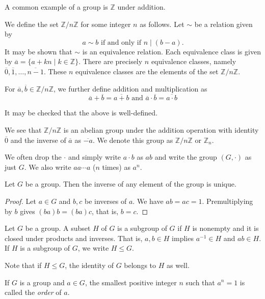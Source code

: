 A common example of a group is $\mathbb{Z}$ under addition.

\vspace{2mm}
We define the set $\mathbb{Z}/n\mathbb{Z}$ for some integer $n$ as follows. Let $\sim$ be a relation given by
$$a\sim b\text{ if and only if }n\mid (b-a).$$
It may be shown that $\sim$ is an equivalence relation. Each equivalence class is given by $\overline{a}=\{a+kn\mid k\in\mathbb{Z}\}$. There are precisely $n$ equivalence classes, namely $\overline{0}, \overline{1}, \ldots, \overline{n-1}$. These $n$ equivalence classes are the elements of the set $\mathbb{Z}/n\mathbb{Z}$.

For $\overline{a}, \overline{b}\in \mathbb{Z}/n\mathbb{Z}$, we further define addition and multiplication as
$$\overline{a}+\overline{b}=\overline{a+b}\text{ and }\overline{a}\cdot\overline{b}=\overline{a\cdot b}$$

It may be checked that the above is well-defined.

We see that $\mathbb{Z}/n\mathbb{Z}$ is an abelian group under the addition operation with identity $\overline{0}$ and the inverse of $\overline{a}$ as $\overline{-a}$. We denote this group as $\mathbb{Z}/n\mathbb{Z}$ or $\mathbb{Z}_n$.

\vspace{2mm}
We often drop the $\cdot$ and simply write $a\cdot b$ as $ab$ and write the group $(G,\cdot)$ as just $G$. We also write $aa\cdots a$ ($n$ times) as $a^n$.

\begin{theorem}
    Let $G$ be a group. Then the inverse of any element of the group is unique.
\end{theorem}
\begin{proof}
    Let $a\in G$ and $b,c$ be inverses of $a$. We have $ab=ac=1$. Premultiplying by $b$ gives $(ba)b=(ba)c$, that is, $b=c$.
\end{proof}

\begin{definition}
    Let $G$ be a group. A subset $H$ of $G$ is a subgroup of $G$ if $H$ is nonempty and it is closed under products and inverses. That is, $a,b\in H$ implies $a^{-1}\in H$ and $ab\in H$. If $H$ is a subgroup of $G$, we write $H\leq G$.
\end{definition}

Note that if $H\leq G$, the identity of $G$ belongs to $H$ as well.

\begin{definition}
    If $G$ is a group and $a\in G$, the smallest positive integer $n$ such that $a^n=1$ is called the \textit{order} of $a$.
\end{definition}

